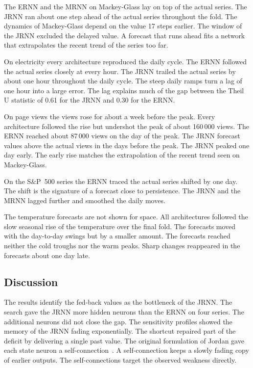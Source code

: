 \documentclass[conference,10pt]{IEEEtran}
\begin{document}
The ERNN and the MRNN on Mackey-Glass lay on top of the actual series.
The JRNN ran about one step ahead of the actual series throughout the
fold.
The dynamics of Mackey-Glass depend on the value 17 steps earlier.
The window of the JRNN excluded the delayed value.
A forecast that runs ahead fits a network that extrapolates the recent
trend of the series too far. 

On electricity every architecture reproduced the daily cycle.
The ERNN followed the actual series closely at every hour.
The JRNN trailed the actual series by about one hour throughout the
daily cycle.
The steep daily ramps turn a lag of one hour into a large error.
The lag explains much of the gap between the Theil U statistic of 0.61
for the JRNN and 0.30 for the ERNN.

On page views the views rose for about a week before the peak.
Every architecture followed the rise but undershot the peak of about
160\,000 views.
The ERNN reached about 87\,000 views on the day of the peak.
The JRNN forecast values above the actual views in the days before the
peak.
The JRNN peaked one day early.
The early rise matches the extrapolation of the recent trend seen on
Mackey-Glass.

On the S\&P~500 series the ERNN traced the actual series shifted by one
day.
The shift is the signature of a forecast close to persistence.
The JRNN and the MRNN lagged further and smoothed the daily moves.

The temperature forecasts are not shown for space.
All architectures followed the slow seasonal rise of the temperature
over the final fold.
The forecasts moved with the day-to-day swings but by a smaller amount.
The forecasts reached neither the cold troughs nor the warm peaks.
Sharp changes reappeared in the forecasts about one day late.

\subsection{Discussion}

The results identify the fed-back values as the bottleneck of the JRNN.
The search gave the JRNN more hidden neurons than the ERNN on four
series.
The additional neurons did not close the gap.
The sensitivity profiles showed the memory of the JRNN fading
exponentially.
The shortcut repaired part of the deficit by delivering a single past
value.
The original formulation of Jordan gave each state neuron a
self-connection~\cite{jordan1986}.
A self-connection keeps a slowly fading copy of earlier outputs.
The self-connections target the observed weakness directly.
\end{document}
